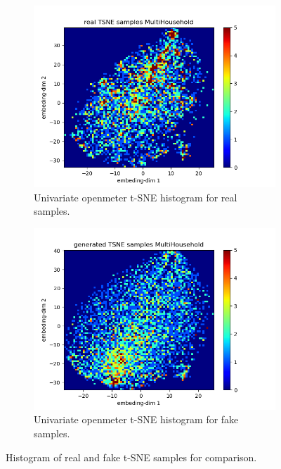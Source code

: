 \begin{figure}
    \centering
    \begin{subfigure}[b]{0.45\textwidth}
        \centering
        \includegraphics[width=\textwidth]{images/om_uni_real_histo.png}
        \caption{Univariate openmeter t-SNE histogram for real samples.}
        \label{fig:om tsne uni real histo}
    \end{subfigure}
    \begin{subfigure}[b]{0.45\textwidth}
        \centering
        \includegraphics[width=\textwidth]{images/om_uni_fake_histo.png}
        \caption{Univariate openmeter t-SNE histogram for fake samples.}
        \label{fig:om tsne uni fake histo}
    \end{subfigure}
       \caption{Histogram of real and fake t-SNE samples for comparison.}
       \label{fig:om tsne uni histo}
\end{figure}

